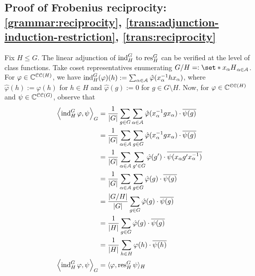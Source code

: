 \subsection{Proof of Frobenius reciprocity: \ref{grammar:reciprocity}, \ref{trans:adjunction-induction-restriction}, \ref{trans:reciprocity}} %
\pan Fix $H \leq G$. The linear adjunction of $\operatorname{ind}_H^G$ to $\operatorname{res}^G_H$ can be verified at the level of class functions. Take coset representatives enumerating $G / H =: \set*{ x_{\alpha} H }_{\alpha \in \mathcal{A}}$. For $\varphi \in \mathbb{C}^{\operatorname{\mathcal{CC}}(H)}$, we have $\operatorname{ind}_H^G (\varphi) (h) := \sum_{\alpha \in \mathcal{A}} \hat{\varphi} (x_{\alpha}^{-1} h x_{\alpha})$, where $\hat{\varphi} (h) := \varphi(h)$ for $h \in H$ and $\hat{\varphi} (g) := 0$ for $g \in G \setminus H$. Now, for $\varphi \in \mathbb{C}^{\operatorname{\mathcal{CC}}(H)}$ and $\psi \in \mathbb{C}^{\operatorname{\mathcal{CC}}(G)}$, observe that
\begin{align*}
  \left\langle \operatorname{ind}_H^G \varphi, \psi \right\rangle_{G}
  &= \frac{1}{\lvert G \rvert} \sum_{g \in G}
    \sum_{\alpha \in \mathcal{A}} \hat{\varphi} (x_{\alpha}^{-1} g x_{\alpha})
    \cdot \overline{\psi(g)}
  \\
  &= \frac{1}{\lvert G \rvert} \sum_{\alpha \in \mathcal{A}} \sum_{g \in G}
    \hat{\varphi} (x_{\alpha}^{-1} g x_{\alpha})
    \cdot \overline{\psi(g)}
  \\
  &= \frac{1}{\lvert G \rvert} \sum_{\alpha \in \mathcal{A}} \sum_{g' \in G}
    \hat{\varphi} (g')
    \cdot \overline{\psi(x_{\alpha} g' x_{\alpha}^{-1})}
  \\
  &= \frac{1}{\lvert G \rvert} \sum_{\alpha \in \mathcal{A}} \sum_{g \in G}
    \hat{\varphi} (g)
    \cdot \overline{\psi(g)}
  \\
  &= \frac{\lvert G / H \rvert}{\lvert G \rvert} \sum_{g \in G}
    \hat{\varphi} (g)
    \cdot \overline{\psi(g)}
  \\
  &= \frac{1}{\lvert H \rvert} \sum_{g \in G}
    \hat{\varphi} (g)
    \cdot \overline{\psi(g)}
  \\
  &= \frac{1}{\lvert H \rvert} \sum_{h \in H}
    \varphi(h)
    \cdot \overline{\psi(h)}
  \\
  \left\langle \operatorname{ind}_H^G \varphi, \psi \right\rangle_{G}
  &= \langle \varphi, \operatorname{res}^G_H \psi \rangle_{H}
\end{align*}
